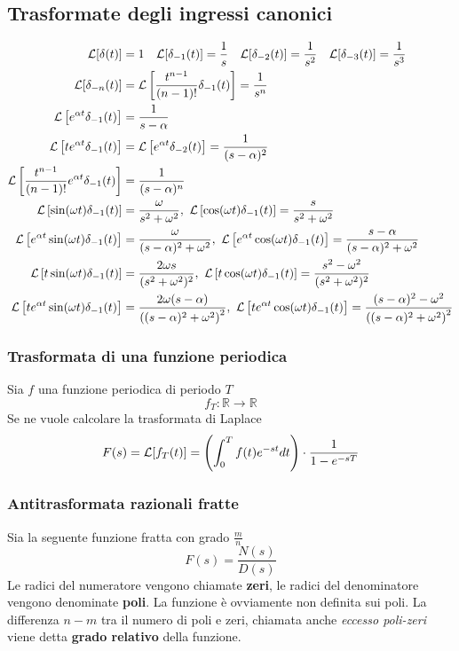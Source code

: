 \subsection{Trasformate degli ingressi canonici}
$$\begin{aligned}
\mathcal{L}[\delta(t)] &= 1 \quad
\mathcal{L}[\delta_{-1}(t)] = \frac{1}{s}\quad
\mathcal{L}[\delta_{-2}(t)] = \frac{1}{s^2}\quad
\mathcal{L}[\delta_{-3}(t)] = \frac{1}{s^3} \\
\mathcal{L}[\delta_{-n}(t)] &= \mathcal{L}\left[\frac{t^{n-1}}{(n-1)!}\delta_{-1}(t)\right] =
\frac{1}{s^n}\\
\mathcal{L}\left[e^{\alpha t}\delta_{-1}(t)\right] &= \frac{1}{s-\alpha}\\
\mathcal{L}\left[te^{\alpha t}\delta_{-1}(t)\right] &=
\mathcal{L} \left[e^{\alpha t}\delta_{-2}(t)\right] =
\frac{1}{(s-\alpha)^2}\\
\mathcal{L}\left[\frac{t^{n-1}}{(n-1)!}e^{\alpha t} \delta_{-1}(t)\right] &=
\frac{1}{(s-\alpha)^n} \\
\mathcal{L}\left[\sin(\omega t)\delta_{-1}(t)\right] &= \frac{\omega}{s^2+\omega^2},\
\mathcal{L}\left[\cos(\omega t)\delta_{-1}(t)\right] = \frac{s}{s^2+\omega^2}\\
\mathcal{L}\left[e^{\alpha t}\sin(\omega t) \delta_{-1}(t)\right] &=
\frac{\omega}{(s-\alpha)^2+\omega^2},\ \mathcal{L}\left[e^{\alpha t}\cos(\omega
t)\delta_{-1}(t)\right] = \frac{s-\alpha}{(s-\alpha)^2+\omega^2}\\
\mathcal{L}\left[t\sin(\omega t)\delta_{-1}(t)\right] & = \frac{2\omega
s}{(s^2+\omega^2)^2},\  \mathcal{L}\left[t\cos(\omega t)\delta_{-1}(t)\right] =
\frac{s^2-\omega^2}{(s^2+\omega^2)^2}\\
\mathcal{L}\left[te^{\alpha t}\sin(\omega t) \delta_{-1}(t)\right] & =
\frac{2\omega(s-\alpha)}{\left((s-\alpha)^2+\omega^2\right)^2},\
\mathcal{L}\left[te^{\alpha t}\cos(\omega t) \delta_{-1}(t)\right] =
\frac{(s-\alpha)^2-\omega^2}{\left((s-\alpha)^2+\omega^2\right)^2}
\end{aligned}
$$

\subsubsection{Trasformata di una funzione periodica}
Sia $f$ una funzione periodica di periodo $T$
$$
f_T: \mathbb{R}\to\mathbb{R}
$$
Se ne vuole calcolare la trasformata di Laplace
$$
F(s) = \mathcal{L}[f_T(t)] = \left(\int_0^Tf(t)e^{-st}dt\right)\cdot\frac{1}{1-e^{-sT}}
$$

\newpage
\subsubsection{Antitrasformata razionali fratte}
Sia la seguente funzione fratta con grado $\frac{m}{n}$
$$
F(s) = \frac{N(s)}{D(s)}
$$
Le radici del numeratore vengono chiamate \textbf{zeri}, le radici del
denominatore vengono denominate \textbf{poli}. La funzione è ovviamente non
definita sui poli.
La differenza $n-m$ tra il numero di poli e zeri, chiamata anche \textit{eccesso
poli-zeri} viene detta \textbf{grado relativo} della funzione.


